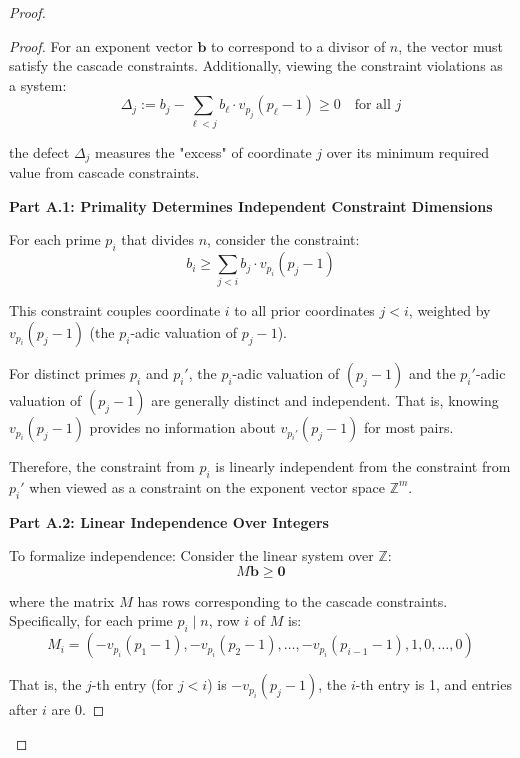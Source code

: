 \begin{proof}
\begin{proof}
For an exponent vector $\mathbf{b}$ to correspond to a divisor of $n$, the vector must satisfy the cascade constraints. Additionally, viewing the constraint violations as a system:
\begin{equation}
\Delta_j := b_j - \sum_{\ell < j} b_\ell \cdot v_{p_j}(p_\ell - 1) \geq 0 \quad \text{for all } j
\end{equation}

the defect $\Delta_j$ measures the "excess" of coordinate $j$ over its minimum required value from cascade constraints.

\noindent \textbf{Part A.1: Primality Determines Independent Constraint Dimensions}

For each prime $p_i$ that divides $n$, consider the constraint:
\begin{equation}
\label{eq:cascade-prime-constraint}
b_i \geq \sum_{j < i} b_j \cdot v_{p_i}(p_j - 1)
\end{equation}

This constraint couples coordinate $i$ to all prior coordinates $j < i$, weighted by $v_{p_i}(p_j - 1)$ (the $p_i$-adic valuation of $p_j - 1$).

For distinct primes $p_i$ and $p_i'$, the $p_i$-adic valuation of $(p_j - 1)$ and the $p_i'$-adic valuation of $(p_j - 1)$ are generally distinct and independent. That is, knowing $v_{p_i}(p_j - 1)$ provides no information about $v_{p_i'}(p_j - 1)$ for most pairs.

Therefore, the constraint from $p_i$ is linearly independent from the constraint from $p_i'$ when viewed as a constraint on the exponent vector space $\mathbb{Z}^m$.

\noindent \textbf{Part A.2: Linear Independence Over Integers}

To formalize independence: Consider the linear system over $\mathbb{Z}$:
\begin{equation}
M \mathbf{b} \geq \mathbf{0}
\end{equation}

where the matrix $M$ has rows corresponding to the cascade constraints. Specifically, for each prime $p_i \mid n$, row $i$ of $M$ is:
\begin{equation}
M_i = (-v_{p_i}(p_1 - 1), -v_{p_i}(p_2 - 1), \ldots, -v_{p_i}(p_{i-1} - 1), 1, 0, \ldots, 0)
\end{equation}

That is, the $j$-th entry (for $j < i$) is $-v_{p_i}(p_j - 1)$, the $i$-th entry is 1, and entries after $i$ are 0.


\end{proof}
\end{proof}
